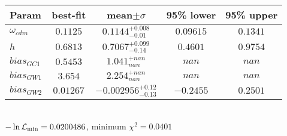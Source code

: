\begin{tabular}{|l|c|c|c|c|} 
 \hline 
Param & best-fit & mean$\pm\sigma$ & 95\% lower & 95\% upper \\ \hline 
$\omega_{cdm }$ &$0.1125$ & $0.1144_{-0.01}^{+0.008}$ & $0.09615$ & $0.1341$ \\ 
$h$ &$0.6813$ & $0.7067_{-0.14}^{+0.099}$ & $0.4601$ & $0.9754$ \\ 
$bias_{GC 1 }$ &$0.5453$ & $1.041_{nan}^{+nan}$ & $nan$ & $nan$ \\ 
$bias_{GW 1 }$ &$3.654$ & $2.254_{nan}^{+nan}$ & $nan$ & $nan$ \\ 
$bias_{GW 2 }$ &$0.01267$ & $-0.002956_{-0.13}^{+0.12}$ & $-0.2455$ & $0.2501$ \\ 
\hline 
 \end{tabular} \\ 
$-\ln{\cal L}_\mathrm{min} =0.0200486$, minimum $\chi^2=0.0401$ \\ 
